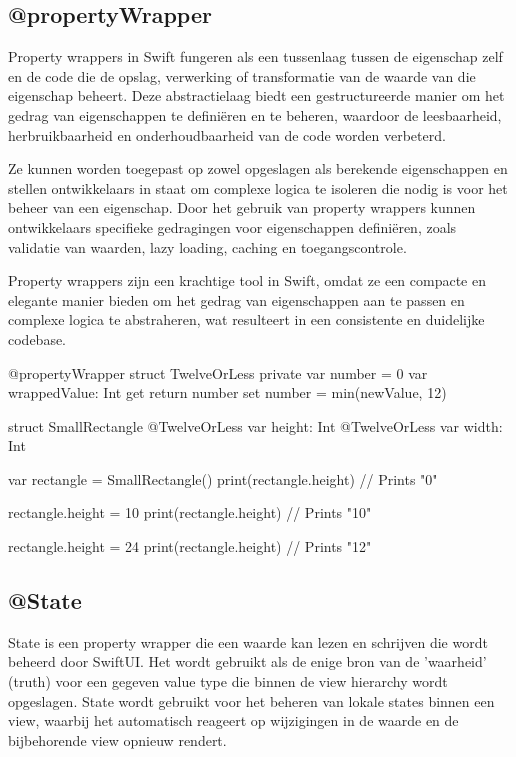 \subsection{@propertyWrapper}
\autocite{ApplePropertyWrapper} Property wrappers in Swift fungeren als een tussenlaag tussen de eigenschap zelf en de code die de opslag, verwerking of transformatie van de waarde van die eigenschap beheert. Deze abstractielaag biedt een gestructureerde manier om het gedrag van eigenschappen te definiëren en te beheren, waardoor de leesbaarheid, herbruikbaarheid en onderhoudbaarheid van de code worden verbeterd.

Ze kunnen worden toegepast op zowel opgeslagen als berekende eigenschappen en stellen ontwikkelaars in staat om complexe logica te isoleren die nodig is voor het beheer van een eigenschap. Door het gebruik van property wrappers kunnen ontwikkelaars specifieke gedragingen voor eigenschappen definiëren, zoals validatie van waarden, lazy loading, caching en toegangscontrole.

Property wrappers zijn een krachtige tool in Swift, omdat ze een compacte en elegante manier bieden om het gedrag van eigenschappen aan te passen en complexe logica te abstraheren, wat resulteert in een consistente en duidelijke codebase.
\begin{swift}[caption=Example property wrapper code \autocite{PropertyWrapperExample}, label=property_wrapper_example]
    @propertyWrapper
    struct TwelveOrLess {
        private var number = 0
        var wrappedValue: Int {
            get { return number }
            set { number = min(newValue, 12) }
        }
    }
    
    struct SmallRectangle {
        @TwelveOrLess var height: Int
        @TwelveOrLess var width: Int
    }
    
    
    var rectangle = SmallRectangle()
    print(rectangle.height)
    // Prints "0"
    
    
    rectangle.height = 10
    print(rectangle.height)
    // Prints "10"
    
    
    rectangle.height = 24
    print(rectangle.height)
    // Prints "12"
\end{swift}


\subsection{@State}
\autocite{AppleState} State is een property wrapper die een waarde kan lezen en schrijven die wordt beheerd door SwiftUI. Het wordt gebruikt als de enige bron van de 'waarheid' (truth) voor een gegeven value type die binnen de view hierarchy wordt opgeslagen. State wordt gebruikt voor het beheren van lokale states binnen een view, waarbij het automatisch reageert op wijzigingen in de waarde en de bijbehorende view opnieuw rendert.


